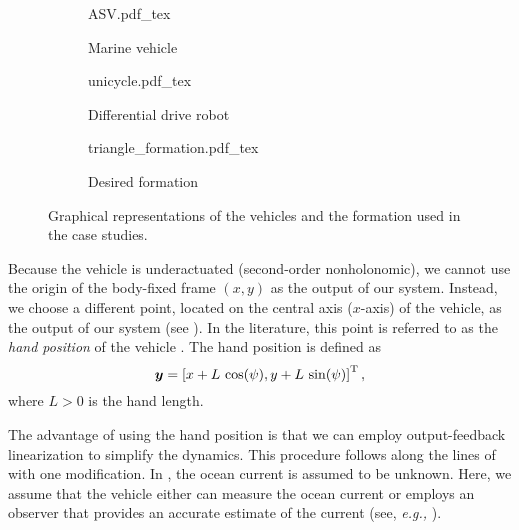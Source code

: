 \begin{figure}[b]
    \centering
    \begin{subfigure}[t]{0.15\textwidth}
        \centering
        \def\svgwidth{\textwidth}
        {ASV.pdf_tex}
        \caption{Marine vehicle}
        \label{fig:ASV}
        
    \end{subfigure}
    \begin{subfigure}[t]{0.15\textwidth}
        \centering
        \def\svgwidth{\textwidth}
        {unicycle.pdf_tex}
        \caption{Differential drive robot}
        \label{fig:unicycle}
        
    \end{subfigure}
    \begin{subfigure}[t]{0.143\textwidth}
        \centering
        \def\svgwidth{\textwidth}
        {triangle_formation.pdf_tex}
        \caption{Desired formation}
        \label{fig:triangle_formation}
        
    \end{subfigure}
    \caption{Graphical representations of the vehicles and the formation used in the case studies.}
\end{figure}

Because the vehicle is underactuated (second-order nonholonomic), we cannot use the origin of the body-fixed frame $(x,y)$ as the output of our system.
Instead, we choose a different point, located on the central axis ($x$-axis) of the vehicle, as the output of our system (see ).
In the literature, this point is referred to as the \emph{hand position} of the vehicle \cite{awton_hand-position-formation_2003,paliotta_trajectory_2019}.
The hand position is defined as
\begin{equation}
    \bm{y} = \left[x + L\,\cos(\psi), y + L\,\sin(\psi)\right]^{\mathrm{T}}, \label{eq:hand}
\end{equation}
where $L > 0$ is the hand length.

The advantage of using the hand position is that we can employ output-feedback linearization to simplify the dynamics.
This procedure follows along the lines of \cite{paliotta_trajectory_2019} with one modification.
In \cite{paliotta_trajectory_2019}, the ocean current is assumed to be unknown.
Here, we assume that the vehicle either can measure the ocean current or employs an observer that provides an accurate estimate of the current (see, \emph{e.g.,} \cite{zhu_kalman_2016}).

